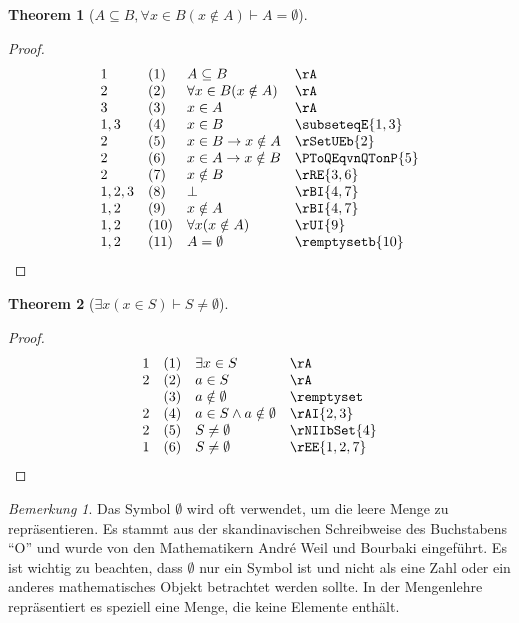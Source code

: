 \documentclass{book}
\theoremstyle{plain}
\newtheorem{theorem}{Theorem}
\theoremstyle{remark}
\newtheorem*{remark}{Bemerkung}
\theoremstyle{definition}
\begin{document}
\label{ASubseteqBwFaxInBLpxNotinARpImpAEqualsEmptyset}
\begin{theorem}[\(A\subseteq B, \forall x\in B(x\notin A)\vdash A=\emptyset\)]
\end{theorem}
\begin{proof}
	\[
	\begin{array}{llll}
		1 & (1) & A\subseteq B & \rA \\
		2 & (2) & \forall x\in B(x\notin A) & \rA\\  
        3 & (3) & x\in A & \rA\\ 
        1,3 & (4) & x\in B & \subseteqE{1,3}\\ 
        2 & (5) & x\in B\rightarrow x\notin A & \rSetUEb{2}\\ 
        2 & (6) & x\in A\rightarrow x\notin B & \PToQEqvnQTonP{5}\\ 
        2 & (7) & x\notin B & \rRE{3,6}\\ 
        1,2,3 & (8) & \bot & \rBI{4,7}\\ 
        1,2 & (9) & x\notin A & \rBI{4,7}\\ 
        1,2 & (10) & \forall x(x\notin A) & \rUI{9}\\ 	
        1,2 & (11) & A=\emptyset & \remptysetb{10}\\ 
	\end{array}
	\]
\end{proof}

\label{ExxInSImpSNotEqualsEmptyset}
\begin{theorem}[\(\exists x(x\in S) \vdash S\neq\emptyset\)]
\end{theorem}
\begin{proof}
	\[
	\begin{array}{llll}
		1 & (1) & \exists x\in S & \rA \\
		2 & (2) & a\in S & \rA \\
		& (3) & a\notin \emptyset & \remptyset \\
		2 & (4) & a\in S\land a\notin \emptyset & \rAI{2,3} \\
		2 & (5) & S\neq\emptyset & \rNIIbSet{4} \\
		1 & (6) & S\neq\emptyset & \rEE{1,2,7} \\
	\end{array}
	\]
\end{proof}
\begin{remark}
	Das Symbol \(\emptyset\) wird oft verwendet, um die leere Menge zu repräsentieren. Es stammt aus der skandinavischen Schreibweise des Buchstabens "`O"' und wurde von den Mathematikern André Weil und Bourbaki eingeführt. Es ist wichtig zu beachten, dass \(\emptyset\) nur ein Symbol ist und nicht als eine Zahl oder ein anderes mathematisches Objekt betrachtet werden sollte. In der Mengenlehre repräsentiert es speziell eine Menge, die keine Elemente enthält.
\end{remark}
\end{document}
